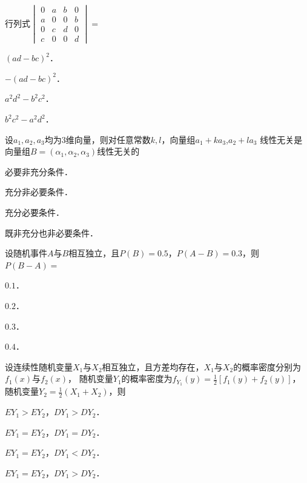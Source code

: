 \documentclass[plain,noanswer,medmath]{../../template/jnuexam}
\begin{document}
\begin{problem}
行列式$\begin{vmatrix}
  0 & a & b & 0 \\
  a & 0 & 0 & b \\
  0 & c & d & 0 \\
  c & 0 & 0 & d
\end{vmatrix} =$\pickout{}
\begin{abcd}
\item $(ad - bc)^2$．
\item $- (ad - bc)^2$．
\item $a^2d^2 - b^2c^2$．
\item $b^2c^2 - a^2d^2$．
\end{abcd}
\end{problem}


\begin{problem}
设$a_1,a_2,a_3$均为$3$维向量，则对任意常数$k,l$，向量组$a_1 + ka_3$,$a_2 + la_3$
线性无关是向量组$B = (\alpha_1,\alpha_2,\alpha_3)$线性无关的\pickout{}
\begin{abcd}
\item 必要非充分条件．
\item 充分非必要条件．
\item 充分必要条件．
\item 既非充分也非必要条件．
\end{abcd}
\end{problem}


\begin{problem}
设随机事件$A$与$B$相互独立，且$P(B) = 0.5$，$P(A - B) = 0.3$，则$P(B - A) =$\pickout{}
\begin{abcd}
\item $0.1$．
\item $0.2$．
\item $0.3$．
\item $0.4$．
\end{abcd}
\end{problem}


\begin{problem}
设连续性随机变量$X_1$与$X_2$相互独立，且方差均存在，$X_1$与$X_2$的概率密度分别为$f_1(x)$与$f_2(x)$，
随机变量$Y_1$的概率密度为$f_{Y_1}(y) = \frac{1}{2}[f_1(y) + f_2(y)]$，
随机变量$Y_2 = \frac{1}{2}(X_1 + X_2)$，则\pickout{}
\begin{abcd}
\item $EY_1 > EY_2$，$DY_1 > DY_2$．
\item $EY_1 = EY_2$，$DY_1 = DY_2$．
\item $EY_1 = EY_2$，$DY_1 < DY_2$．
\item $EY_1 = EY_2$，$DY_1 > DY_2$．
\end{abcd}
\end{problem}
\end{document}
